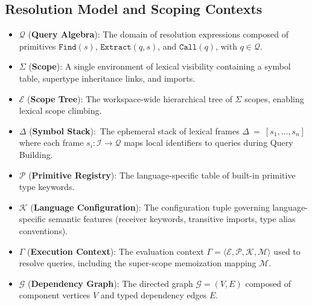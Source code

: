 \subsection{Resolution Model and Scoping Contexts}
\begin{itemize}
  \item $\mathcal{Q}$ (\textbf{Query Algebra}): The domain of
    resolution expressions
    composed of primitives $\texttt{Find}(s)$, $\texttt{Extract}(q,
    s)$, and $\texttt{Call}(q)$, with $q \in \mathcal{Q}$.
  \item $\Sigma$ (\textbf{Scope}): A single environment of lexical visibility
    containing a symbol table, supertype inheritance links, and imports.
  \item $\mathcal{E}$ (\textbf{Scope Tree}): The workspace-wide hierarchical
    tree of $\Sigma$ scopes, enabling lexical scope climbing.
  \item $\Delta$ (\textbf{Symbol Stack}):\ The ephemeral stack of lexical frames
    $\Delta\:{=}\:[s_1, \dots, s_n]$ where each frame $s_i : \mathcal{I}
    \to \mathcal{Q}$
    maps local identifiers to queries during Query Building.
  \item $\mathcal{P}$ (\textbf{Primitive Registry}): The language-specific table
    of built-in primitive type keywords.
  \item $\mathcal{K}$ (\textbf{Language Configuration}): The configuration tuple
    governing lan\-guage-specific semantic features (receiver keywords,
    transitive imports, type alias conventions).
  \item $\Gamma$ (\textbf{Execution Context}): The evaluation context
    $\Gamma = \langle \mathcal{E}, \mathcal{P}, \mathcal{K},
    \mathcal{M} \rangle$ used to resolve queries, including the
    super-scope memoization mapping $\mathcal{M}$.
  \item $\mathcal{G}$ (\textbf{Dependency Graph}): The directed graph
    $\mathcal{G} = (V, E)$
    composed of component vertices $V$ and typed dependency edges $E$.
\end{itemize}

